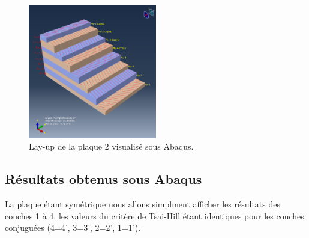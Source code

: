 \documentclass[a4paper,12pt]{article}
\begin{document}
\begin{figure}[h!]
	\centering
	\includegraphics[width=0.5\textwidth]{media/K_P2_layout_12042025.png} %
	\caption{Lay-up de la plaque 2 visualisé sous Abaqus.}
	\label{fig:exemple_image}
\end{figure}

\subsection{Résultats obtenus sous Abaqus}

La plaque étant symétrique nous allons simplment afficher les résultats des couches 1 à 4, les valeurs du critère de Tsai-Hill étant identiques pour les couches conjuguées (4=4', 3=3', 2=2', 1=1').
\end{document}
